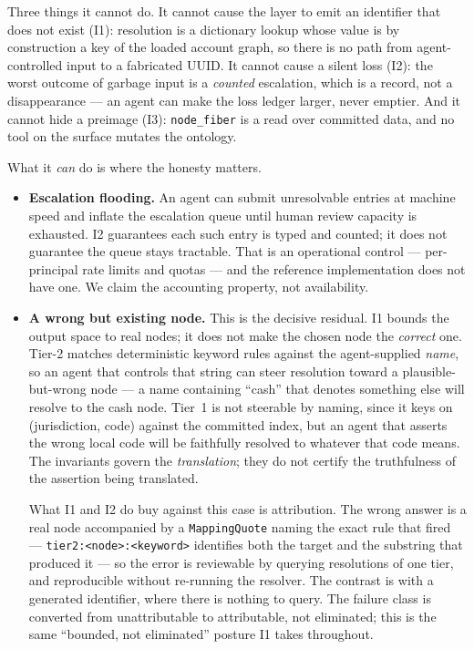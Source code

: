 \documentclass[11pt]{clapps}  %
\begin{document}
Three things it cannot do. It cannot cause the layer to emit an identifier that
does not exist (I1): resolution is a dictionary lookup whose value is by
construction a key of the loaded account graph, so there is no path from
agent-controlled input to a fabricated UUID. It cannot cause a silent loss (I2):
the worst outcome of garbage input is a \emph{counted} escalation, which is a
record, not a disappearance --- an agent can make the loss ledger larger, never
emptier. And it cannot hide a preimage (I3): \texttt{node\_fiber} is a read over
committed data, and no tool on the surface mutates the ontology.

What it \emph{can} do is where the honesty matters.

\begin{itemize}
  \item \textbf{Escalation flooding.} An agent can submit unresolvable entries
  at machine speed and inflate the escalation queue until human review capacity
  is exhausted. I2 guarantees each such entry is typed and counted; it does not
  guarantee the queue stays tractable. That is an operational control ---
  per-principal rate limits and quotas --- and the reference implementation does
  not have one. We claim the accounting property, not availability.

  \item \textbf{A wrong but existing node.} This is the decisive residual. I1
  bounds the output space to real nodes; it does not make the chosen node the
  \emph{correct} one. Tier-2 matches deterministic keyword rules against the
  agent-supplied \emph{name}, so an agent that controls that string can steer
  resolution toward a plausible-but-wrong node --- a name containing
  ``cash'' that denotes something else will resolve to the cash node. Tier~1 is
  not steerable by naming, since it keys on (jurisdiction, code) against the
  committed index, but an agent that asserts the wrong local code will be
  faithfully resolved to whatever that code means. The invariants govern the
  \emph{translation}; they do not certify the truthfulness of the assertion
  being translated.

  What I1 and I2 do buy against this case is attribution. The wrong answer is a
  real node accompanied by a \texttt{MappingQuote} naming the exact rule that
  fired --- \texttt{tier2:<node>:<keyword>} identifies both the target and the
  substring that produced it --- so the error is reviewable by querying
  resolutions of one tier, and reproducible without re-running the resolver. The
  contrast is with a generated identifier, where there is nothing to query. The
  failure class is converted from unattributable to attributable, not
  eliminated; this is the same ``bounded, not eliminated'' posture I1 takes
  throughout.


\end{itemize}
\end{document}
